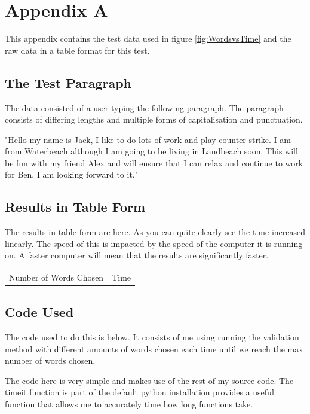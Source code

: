 \documentclass[10pt,a4paper]{report}
\begin{document}
\chapter*{Appendix A}

This appendix contains the test data used in figure \ref{fig:WordsvsTime} and the raw data in a table format for this test.

\section*{The Test Paragraph}
The data consisted of a user typing the following paragraph. The paragraph consists of differing lengths and multiple forms of capitalisation and punctuation.

"Hello my name is Jack, I like to do lots of work and play counter strike. I am from Waterbeach although I am going to be living in Landbeach soon. This will be fun with my friend Alex and will ensure that I can relax and continue to work for Ben. I am looking forward to it."

\section*{Results in Table Form}
The results in table form are here. As you can quite clearly see the time increased linearly. The speed of this is impacted by the speed of the computer it is running on. A faster computer will mean that the results are significantly faster.

\begin{center}
	\begin{tabular}{|c|c|}
		Number of Words Chosen & Time \\
	\end{tabular}
\end{center}

\section*{Code Used}
The code used to do this is below. It consists of me using running the validation method with different amounts of words chosen each time until we reach the max number of words chosen.

The code here is very simple and makes use of the rest of my source code. The timeit function\cite{pythonsoftwarefoundation_2022} is part of the default python installation provides a useful function that allows me to accurately time how long functions take. 
\end{document}

